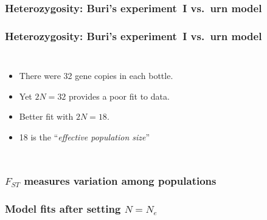 \begin{frame}
\frametitle{Heterozygosity: Buri's experiment~I vs.\ urn model}

\end{frame}

\begin{frame}
\frametitle{Heterozygosity: Buri's experiment~I vs.\ urn model}
\begin{columns}

\begin{itemize}
\item There were 32 gene copies in each bottle.
\item Yet $2N=32$ provides a poor fit to data.
\item Better fit with $2N=18$.
\item 18 is the ``\emph{effective population size}''
\end{itemize}
\end{columns}
\end{frame}

\begin{frame}
\frametitle{$F_{ST}$ measures variation among populations}

\end{frame}

\begin{frame}
\frametitle{Model fits after setting $N=N_e$}

\end{frame}

